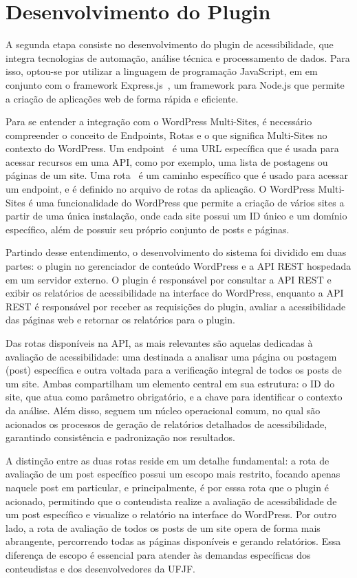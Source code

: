 \documentclass[
	article,			%
	12pt,				%
	oneside,			%
	a4paper,			%
	section=TITLE,		%
	subsection=TITLE,	%
	english,			%
	brazil,				%
	sumario=tradicional
	]{abntex2}
\begin{document}
\chapter*{Desenvolvimento do Plugin}
A segunda etapa consiste no desenvolvimento do plugin de acessibilidade, que
integra tecnologias de automação, análise técnica e processamento de
dados. Para isso, optou-se por utilizar a linguagem de programação JavaScript, em
em conjunto com o framework Express.js~\cite{express}, um framework 
para Node.js que permite a criação de aplicações web de forma rápida
e eficiente.

Para se entender a integração com o WordPress Multi-Sites, é necessário compreender 
o conceito de Endpoints, Rotas e o que significa Multi-Sites no contexto do WordPress.
Um endpoint~\cite{endpoints} é uma URL específica que é usada para acessar
recursos em uma API, como por exemplo, uma lista de postagens ou páginas de um site. Uma
rota~\cite{routes} é um caminho específico que é usado para acessar um endpoint,
e é definido no arquivo de rotas da aplicação. O WordPress Multi-Sites é uma funcionalidade
do WordPress que permite a criação de vários sites a partir de uma única instalação,
onde cada site possui um ID único e um domínio específico, além de possuir seu próprio
conjunto de posts e páginas.

Partindo desse entendimento, o desenvolvimento do sistema foi dividido em duas partes: 
o plugin no gerenciador de conteúdo WordPress e a 
API REST hospedada em um servidor externo. O plugin é responsável por
consultar a API REST e exibir os relatórios de acessibilidade na interface do
WordPress, enquanto a API REST é responsável por receber as requisições
do plugin, avaliar a acessibilidade das páginas web e retornar os relatórios
para o plugin.

Das rotas disponíveis na API, as mais relevantes são aquelas dedicadas
à avaliação de acessibilidade: uma destinada a analisar uma página ou postagem (post)
específica e outra voltada para a verificação integral de todos os posts de um
site. Ambas compartilham um elemento central em sua estrutura: o ID do
site, que atua como parâmetro obrigatório, e a chave para identificar o contexto
da análise. Além disso, seguem um núcleo operacional comum, no qual são
acionados os processos de geração de relatórios detalhados de acessibilidade,
garantindo consistência e padronização nos resultados.

A distinção entre as duas rotas reside em um detalhe fundamental: a rota
de avaliação de um post específico possui um escopo mais restrito, focando
apenas naquele post em particular, e principalmente, é por esssa rota que
o plugin é acionado, permitindo que o conteudista realize a avaliação de
acessibilidade de um post específico e visualize o relatório na interface do
WordPress. Por outro lado, a rota de avaliação de todos os posts de um site
opera de forma mais abrangente, percorrendo todas as páginas disponíveis
e gerando relatórios. Essa diferença de escopo é essencial para atender às
demandas específicas dos conteudistas e dos desenvolvedores da UFJF.
\bigbreak
\end{document}
